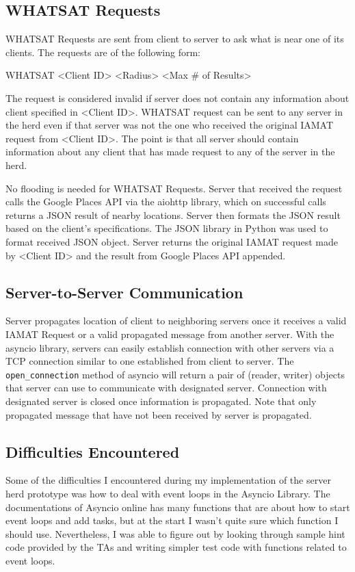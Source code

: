 \subsection{WHATSAT Requests}
WHATSAT Requests are sent from client to server to ask what is near one of its clients. The requests are of the following form:
\begin{center}
    WHATSAT <Client ID> <Radius> <Max \# of Results>
\end{center}
The request is considered invalid if server does not contain any information about client specified in <Client ID>. WHATSAT request can be sent to any server in the herd even if that server was not the one who received the original IAMAT request from <Client ID>. The point is that all server should contain information about any client that has made request to any of the server in the herd. \par
No flooding is needed for WHATSAT Requests. Server that received the request calls the Google Places API via the aiohttp library, which on successful calls returns a JSON result of nearby locations. Server then formats the JSON result based on the client's specifications. The JSON library in Python was used to format received JSON object. Server returns the original IAMAT request made by <Client ID> and the result from Google Places API appended. 

\subsection{Server-to-Server Communication}
Server propagates location of client to neighboring servers once it receives a valid IAMAT Request or a valid propagated message from another server. With the asyncio library, servers can easily establish connection with other servers via a TCP connection similar to one established from client to server. The \texttt{open\_connection} method of asyncio will return a pair of (reader, writer) objects that server can use to communicate with designated server. Connection with designated server is closed once information is propagated. Note that only propagated message that have not been received by server is propagated.

\subsection{Difficulties Encountered}
Some of the difficulties I encountered during my implementation of the server herd prototype was how to deal with event loops in the Asyncio Library. The documentations of Asyncio online has many functions that are about how to start event loops and add tasks, but at the start I wasn't quite sure which function I should use. Nevertheless, I was able to figure out by looking through sample hint code provided by the TAs and writing simpler test code with functions related to event loops.


